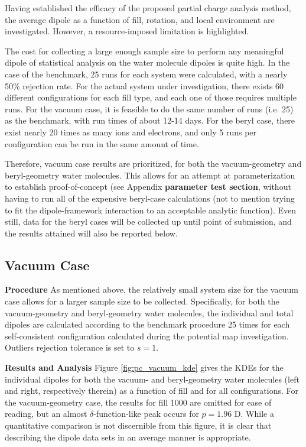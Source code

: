     Having established the efficacy of the proposed partial charge analysis method, the average dipole as a function of fill, rotation, and local environment are investigated. However, a resource-imposed limitation is highlighted.
    
    The cost for collecting a large enough sample size to perform any meaningful dipole of statistical analysis on the water molecule dipoles is quite high. In the case of the benchmark, 25 runs for each system were calculated, with a nearly 50\% rejection rate. For the actual system under investigation, there exists 60 different configurations for each fill type, and each one of those requires multiple runs. For the vacuum case, it is feasible to do the same number of runs (i.e. 25) as the benchmark, with run times of about 12-14 days. For the beryl case, there exist nearly 20 times as many ions and electrons, and only 5 runs per configuration can be run in the same amount of time. 
    
    Therefore, vacuum case results are prioritized, for both the vacuum-geometry and beryl-geometry water molecules. This allows for an attempt at parameterization to establish proof-of-concept (see Appendix \textbf{parameter test section}, without having to run all of the expensive beryl-case calculations (not to mention trying to fit the dipole-framework interaction to an acceptable analytic function). Even still, data for the beryl cases will be collected up until point of submission, and the results attained will also be reported below.
    
        \subsection{Vacuum Case}
        
        \textbf{Procedure} As mentioned above, the relatively small system size for the vacuum case allows for a larger sample size to be collected. Specifically, for both the vacuum-geometry and beryl-geometry water molecules, the individual and total dipoles are calculated according to the benchmark procedure 25 times for each self-consistent configuration calculated during the potential map investigation. Outliers rejection tolerance is set to $s=1$.
        
        \textbf{Results and Analysis} Figure \ref{fig:pc_vacuum_kde} gives the KDEs for the individual dipoles for both the vacuum- and beryl-geometry water molecules (left and right, respectively therein) as a function of fill and for all configurations. For the vacuum-geometry case, the results for fill 1000 are omitted for ease of reading, but an almost $\delta$-function-like peak occurs for $p = 1.96$ D. While a quantitative comparison is not discernible from this figure, it is clear that describing the dipole data sets in an average manner is appropriate.
        
